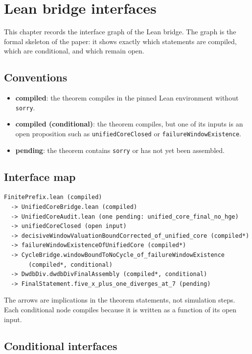 \section{Lean bridge interfaces}

This chapter records the interface graph of the Lean bridge.  The
graph is the formal skeleton of the paper: it shows exactly which
statements are compiled, which are conditional, and which remain
open.

\subsection{Conventions}

\begin{itemize}[leftmargin=*]
\item \textbf{compiled}: the theorem compiles in the pinned Lean
  environment without \texttt{sorry}.
\item \textbf{compiled (conditional)}: the theorem compiles, but one
  of its inputs is an open proposition such as
  \texttt{unifiedCoreClosed} or \texttt{failureWindowExistence}.
\item \textbf{pending}: the theorem contains \texttt{sorry} or has not
  yet been assembled.
\end{itemize}

\subsection{Interface map}

\begin{verbatim}
FinitePrefix.lean (compiled)
  -> UnifiedCoreBridge.lean (compiled)
  -> UnifiedCoreAudit.lean (one pending: unified_core_final_no_hge)
  -> unifiedCoreClosed (open input)
  -> decisiveWindowValuationBoundCorrected_of_unified_core (compiled*)
  -> failureWindowExistenceOfUnifiedCore (compiled*)
  -> CycleBridge.windowBoundToNoCycle_of_failureWindowExistence
       (compiled*, conditional)
  -> DwdbDiv.dwdbDivFinalAssembly (compiled*, conditional)
  -> FinalStatement.five_x_plus_one_diverges_at_7 (pending)
\end{verbatim}

The arrows are implications in the theorem statements, not simulation
steps.  Each conditional node compiles because it is written as a
function of its open input.

\subsection{Conditional interfaces}

